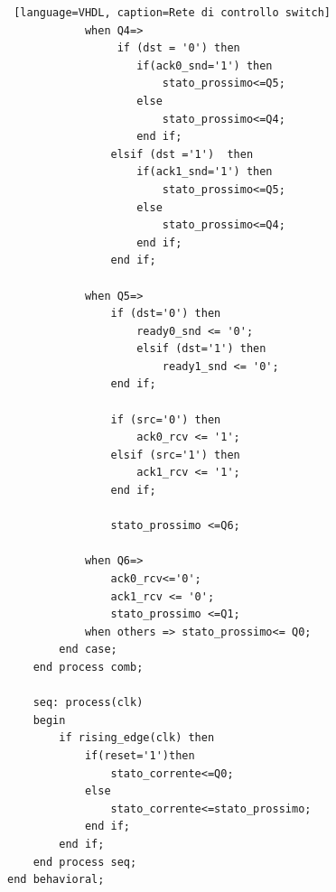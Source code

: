 \begin{lstlisting} [language=VHDL, caption=Rete di controllo switch]
            when Q4=>
                 if (dst = '0') then
                    if(ack0_snd='1') then
                        stato_prossimo<=Q5;
                    else
                        stato_prossimo<=Q4;
                    end if;
                elsif (dst ='1')  then
                    if(ack1_snd='1') then
                        stato_prossimo<=Q5;
                    else
                        stato_prossimo<=Q4;
                    end if;
                end if;

            when Q5=>
                if (dst='0') then
                    ready0_snd <= '0';
                    elsif (dst='1') then
                        ready1_snd <= '0';
                end if;
                
                if (src='0') then
                    ack0_rcv <= '1';
                elsif (src='1') then
                    ack1_rcv <= '1';
                end if;
 
                stato_prossimo <=Q6;

            when Q6=>
                ack0_rcv<='0';
                ack1_rcv <= '0';
                stato_prossimo <=Q1;
            when others => stato_prossimo<= Q0;
        end case;
    end process comb;

    seq: process(clk)
    begin
        if rising_edge(clk) then
            if(reset='1')then
                stato_corrente<=Q0;
            else
                stato_corrente<=stato_prossimo;
            end if;
        end if;
    end process seq;
end behavioral;
\end{lstlisting}


